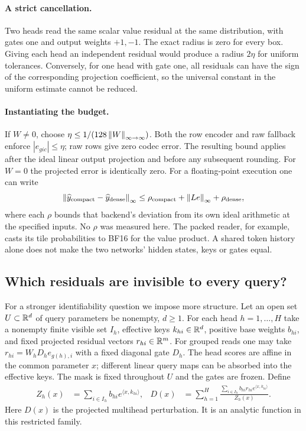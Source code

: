 \paragraph{A strict cancellation.}
Two heads read the same scalar value residual at the same distribution, with gates one and output weights $+1,-1$. The exact radius is zero for every box. Giving each head an independent residual would produce a radius $2\eta$ for uniform tolerances. Conversely, for one head with gate one, all residuals can have the sign of the corresponding projection coefficient, so the universal constant in the uniform estimate cannot be reduced.

\paragraph{Instantiating the budget.}
If $W\ne0$, choose $\eta\le1/(128\left\lVert W\right\rVert_{\infty\to\infty})$. Both the row encoder and raw fallback enforce $|e_{gic}|\le\eta$; raw rows give zero codec error. The resulting bound applies after the ideal linear output projection and before any subsequent rounding. For $W=0$ the projected error is identically zero. For a floating-point execution one can write
\begin{equation}
 \left\lVert \widehat y_{\rm compact}-\widehat y_{\rm dense}\right\rVert_\infty
 \le \rho_{\rm compact}+\left\lVert Le\right\rVert_\infty+\rho_{\rm dense},
 \label{eq:round}
\end{equation}
where each $\rho$ bounds that backend's deviation from its own ideal arithmetic at the specified inputs. No $\rho$ was measured here. The packed reader, for example, casts its tile probabilities to BF16 for the value product. A shared token history alone does not make the two networks' hidden states, keys or gates equal.

\subsection{Which residuals are invisible to every query?}
For a stronger identifiability question we impose more structure. Let an open set $U\subset\mathbb R^d$ of query parameters be nonempty, $d\ge1$. For each head $h=1,\ldots,H$ take a nonempty finite visible set $I_h$, effective keys $k_{hi}\in\mathbb R^d$, positive base weights $b_{hi}$, and fixed projected residual vectors $r_{hi}\in\mathbb R^m$. For grouped reads one may take $r_{hi}=W_h D_h e_{g(h),i}$ with a fixed diagonal gate $D_h$. The head scores are affine in the common parameter $x$; different linear query maps can be absorbed into the effective keys. The mask is fixed throughout $U$ and the gates are frozen. Define
\begin{align}
 Z_h(x)&=\sum_{i\in I_h} b_{hi}e^{\langle x,k_{hi}\rangle},&
 D(x)&=\sum_{h=1}^H
   \frac{\sum_{i\in I_h} b_{hi}r_{hi}e^{\langle x,k_{hi}\rangle}}{Z_h(x)} .
 \label{eq:visible}
\end{align}
Here $D(x)$ is the projected multihead perturbation. It is an analytic function in this restricted family.

